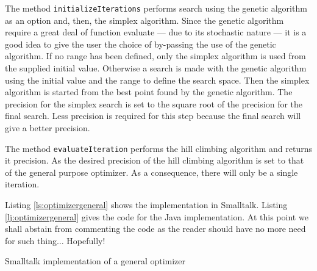 \documentclass[twoside]{book}
\begin{document}
The method {\tt initializeIterations} performs search using the
genetic algorithm as an option and, then, the simplex algorithm.
Since the genetic algorithm require a great deal of function
evaluate --- due to its stochastic nature --- it is a good idea to
give the user the choice of by-passing the use of the genetic
algorithm. If no range has been defined, only the simplex
algorithm is used from the supplied initial value. Otherwise a
search is made with the genetic algorithm using the initial value
and the range to define the search space. Then the simplex
algorithm is started from the best point found by the genetic
algorithm. The precision for the simplex search is set to the
square root of the precision for the final search. Less precision
is required for this step because the final search will give a
better precision.

The method {\tt evaluateIteration} performs the hill climbing
algorithm and returns it precision. As the desired precision of
the hill climbing algorithm is set to that of the general purpose
optimizer. As a consequence, there will only be a single
iteration.

Listing \ref{ls:optimizergeneral} shows the implementation in
Smalltalk. Listing \ref{lj:optimizergeneral} gives the code for
the Java implementation. At this point we shall abstain from
commenting the code as the reader should have no more need for
such thing$\ldots$ Hopefully!

\begin{listing} Smalltalk
implementation of a general optimizer \label{ls:optimizergeneral}

\end{listing}

\ifx\wholebook\relax\else
\end{document}
